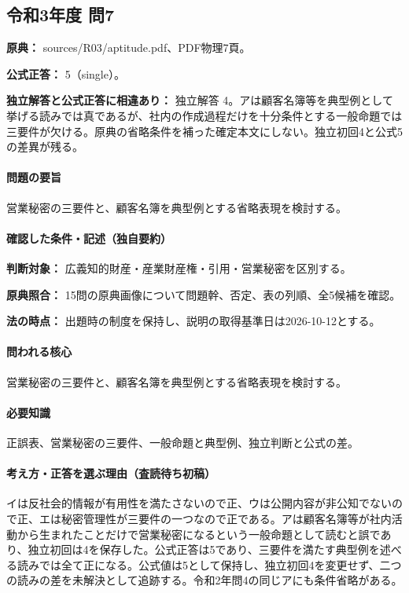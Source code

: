 \subsection{令和3年度 問7}
\label{q:r03-reg-apt-07}

\noindent\textbf{原典：} sources/R03/aptitude.pdf、PDF物理7頁。

\textbf{公式正答：} 5（single）。

\par\textbf{独立解答と公式正答に相違あり：} 独立解答 4。アは顧客名簿等を典型例として挙げる読みでは真であるが、社内の作成過程だけを十分条件とする一般命題では三要件が欠ける。原典の省略条件を補った確定本文にしない。独立初回4と公式5の差異が残る。

\paragraph{問題の要旨} 営業秘密の三要件と、顧客名簿を典型例とする省略表現を検討する。

\paragraph{確認した条件・記述（独自要約）}\mbox{}\par

\noindent\textbf{判断対象：} 広義知的財産・産業財産権・引用・営業秘密を区別する。\par

\noindent\textbf{原典照合：} 15問の原典画像について問題幹、否定、表の列順、全5候補を確認。\par

\noindent\textbf{法の時点：} 出題時の制度を保持し、説明の取得基準日は2026-10-12とする。\par

\paragraph{問われる核心} 営業秘密の三要件と、顧客名簿を典型例とする省略表現を検討する。

\paragraph{必要知識} 正誤表、営業秘密の三要件、一般命題と典型例、独立判断と公式の差。

\paragraph{考え方・正答を選ぶ理由（査読待ち初稿）} イは反社会的情報が有用性を満たさないので正、ウは公開内容が非公知でないので正、エは秘密管理性が三要件の一つなので正である。アは顧客名簿等が社内活動から生まれたことだけで営業秘密になるという一般命題として読むと誤であり、独立初回は4を保存した。公式正答は5であり、三要件を満たす典型例を述べる読みでは全て正になる。公式値は5として保持し、独立初回4を変更せず、二つの読みの差を未解決として追跡する。令和2年問4の同じアにも条件省略がある。

